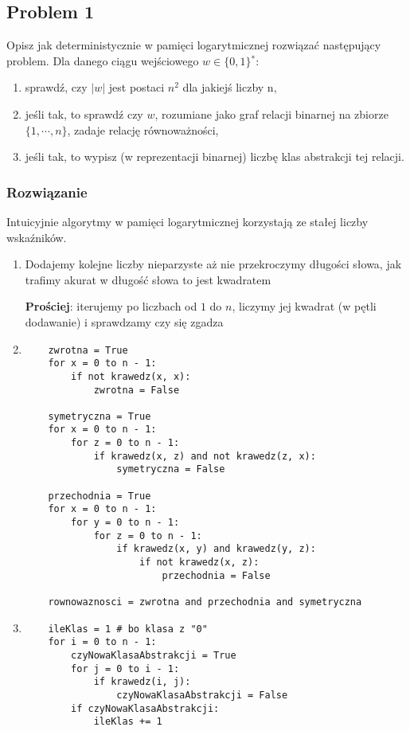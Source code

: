 \subsection{Problem 1}

Opisz jak deterministycznie w pamięci logarytmicznej rozwiązać następujący problem. Dla danego ciągu wejściowego $w \in \{0, 1\}^∗$:
\begin{enumerate}
    \item sprawdź, czy $|w|$ jest postaci $n^2$ dla jakiejś liczby n,
    \item jeśli tak, to sprawdź czy $w$, rozumiane jako graf relacji binarnej na zbiorze $\{1, \cdots, n\}$, zadaje relację równoważności,
    \item jeśli tak, to wypisz (w reprezentacji binarnej) liczbę klas abstrakcji tej relacji.
\end{enumerate}

\subsubsection*{Rozwiązanie}

Intuicyjnie algorytmy w pamięci logarytmicznej korzystają ze stałej liczby wskaźników.

\begin{enumerate}
    \item Dodajemy kolejne liczby nieparzyste aż nie przekroczymy długości słowa, jak trafimy akurat w długość słowa to jest kwadratem
    
    \textbf{Prościej}: iterujemy po liczbach od $1$ do $n$, liczymy jej kwadrat (w pętli dodawanie) i sprawdzamy czy się zgadza
    \item \begin{verbatim}
    zwrotna = True
    for x = 0 to n - 1:
        if not krawedz(x, x):
            zwrotna = False
    
    symetryczna = True
    for x = 0 to n - 1:
        for z = 0 to n - 1:
            if krawedz(x, z) and not krawedz(z, x):
                symetryczna = False
    
    przechodnia = True
    for x = 0 to n - 1:
        for y = 0 to n - 1:
            for z = 0 to n - 1:
                if krawedz(x, y) and krawedz(y, z):
                    if not krawedz(x, z):
                        przechodnia = False
                        
    rownowaznosci = zwrotna and przechodnia and symetryczna
    \end{verbatim}
    
    \item \begin{verbatim}
    ileKlas = 1 # bo klasa z "0"
    for i = 0 to n - 1:
        czyNowaKlasaAbstrakcji = True
        for j = 0 to i - 1:
            if krawedz(i, j):
                czyNowaKlasaAbstrakcji = False
        if czyNowaKlasaAbstrakcji:
            ileKlas += 1
    \end{verbatim}
\end{enumerate}

